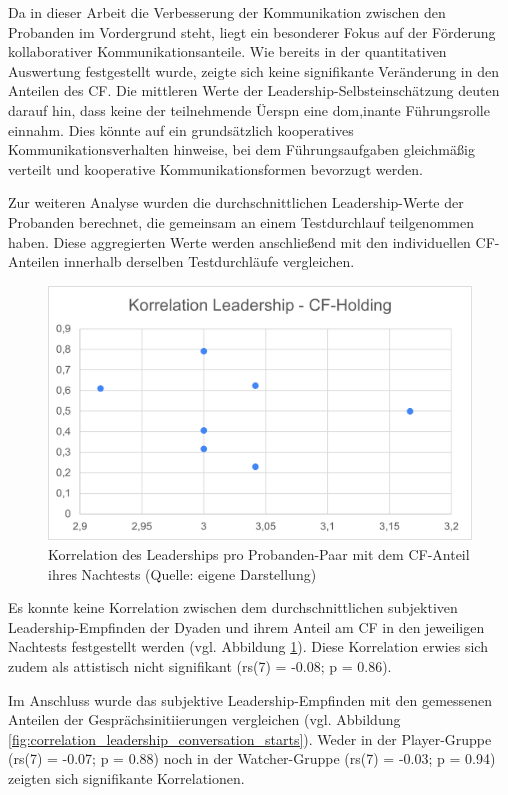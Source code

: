 Da in dieser Arbeit die Verbesserung der Kommunikation zwischen den Probanden im Vordergrund steht, liegt ein besonderer Fokus auf der Förderung kollaborativer Kommunikationsanteile. Wie bereits in der quantitativen Auswertung festgestellt wurde, zeigte sich keine signifikante Veränderung in den Anteilen des \ac{CF}. Die mittleren Werte der Leadership-Selbsteinschätzung deuten darauf hin, dass keine der teilnehmende Üerspn eine dom,inante Führungsrolle einnahm. Dies könnte auf ein grundsätzlich kooperatives Kommunikationsverhalten hinweise, bei dem Führungsaufgaben gleichmäßig verteilt und kooperative Kommunikationsformen bevorzugt werden.

Zur weiteren Analyse wurden die durchschnittlichen Leadership-Werte der Probanden berechnet, die gemeinsam an einem Testdurchlauf teilgenommen haben. Diese aggregierten Werte werden anschließend mit den individuellen \ac{CF}-Anteilen innerhalb derselben Testdurchläufe vergleichen.

\begin{figure}[ht]
\centering
\includegraphics[width=1\linewidth]{content/pictures/korrelation_leadership_cfh.png}
\caption{Korrelation des Leaderships pro Probanden-Paar mit dem \ac{CF}-Anteil ihres Nachtests (Quelle: eigene Darstellung)}
\label{fig:correlation_leadership_cfh}
\end{figure}

Es konnte keine Korrelation  zwischen dem durchschnittlichen subjektiven Leadership-Empfinden der Dyaden und ihrem Anteil am \ac{CF} in den jeweiligen Nachtests festgestellt werden (vgl. Abbildung \ref{fig:correlation_leadership_cfh}). Diese Korrelation erwies sich zudem als attistisch nicht signifikant (rs(7) = -0.08; p = 0.86).

Im Anschluss wurde das subjektive Leadership-Empfinden mit den gemessenen Anteilen der Gesprächsinitiierungen vergleichen (vgl. Abbildung \ref{fig:correlation_leadership_conversation_starts}). Weder in der Player-Gruppe  (rs(7) = -0.07; p = 0.88) noch in der Watcher-Gruppe (rs(7) = -0.03; p = 0.94) zeigten sich signifikante Korrelationen.

